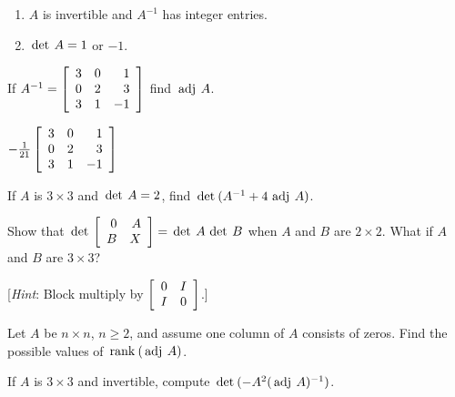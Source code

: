 \begin{multicols}{2}
\begin{ex}
\begin{enumerate}
\item $A$ is invertible and $A^{-1}$ has integer entries.

\item $\thinspace\operatorname{det \medspace}A = 1$ or $-1$.

\end{enumerate}
\end{ex}

\begin{ex}
If $A^{-1} = \left[ \begin{array}{rrr}
3 & 0 & 1 \\ 
0 & 2 & 3 \\
3 & 1 & -1 
\end{array}\right]$
 find $\thinspace\operatorname{adj \medspace}A$.

\begin{sol}
$-\tfrac{1}{21}\left[\begin{array}{rrr}
3 & 0 & 1 \\
0 & 2 & 3\\
3 & 1 & -1 
\end{array}\right]$
\end{sol}
\end{ex}

\begin{ex}
If $A$ is $3 \times 3$ and $\thinspace\operatorname{det \medspace}A = 2$, find $\thinspace\operatorname{det\medspace}(A^{-1} + 4 \thinspace\operatorname{adj \medspace}A)$.
\end{ex}

\begin{ex}
Show that $\thinspace\operatorname{det\medspace} \left[ \begin{array}{rr}
0 & A \\
B & X 
\end{array}\right] = \thinspace\operatorname{det \medspace}A \thinspace\operatorname{det \medspace}B$ when $A$ and $B$ are $2 \times 2$. What if $A$ and $B$ are $3 \times 3$?


[\textit{Hint}: Block multiply by $ \left[ \begin{array}{rr}
0 & I \\
I & 0 
\end{array}\right]$.]
\end{ex}

\begin{ex}
Let $A$ be $n \times n$, $n \geq 2$, and assume one column of $A$ consists of zeros. Find the possible values of $\thinspace\operatorname{rank\medspace}(\thinspace\operatorname{adj \medspace}A)$.
\end{ex}

\begin{ex}
If $A$ is $3 \times 3$ and invertible, compute $\thinspace\operatorname{det\medspace}(-A^{2}(\thinspace\operatorname{adj \medspace}A)^{-1})$.
\end{ex}


\end{multicols}
